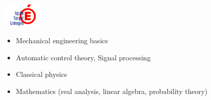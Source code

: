 \noindent
\begin{minipage}{.15\textwidth}
\centerline{\includegraphics[width=20mm]{img/turgot}}
\end{minipage}%
\hspace{5mm}
\begin{minipage}{.7\textwidth}
\raggedright
    \begin{itemize}
        \item Mechanical engineering basics
        \item Automatic control theory, Signal processing
		\item Classical physics
		\item Mathematics (real analysis, linear algebra, probability theory)
    \end{itemize}
\end{minipage}
